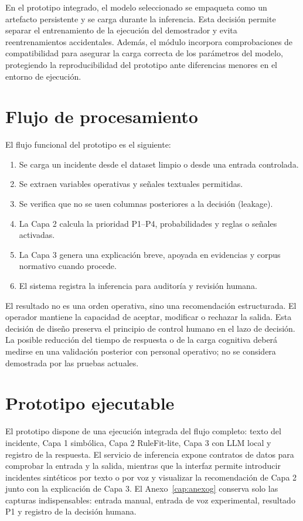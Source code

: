 En el prototipo integrado, el modelo seleccionado se empaqueta como un artefacto persistente y se carga durante la inferencia. Esta decisión permite separar el entrenamiento de la ejecución del demostrador y evita reentrenamientos accidentales. Además, el módulo incorpora comprobaciones de compatibilidad para asegurar la carga correcta de los parámetros del modelo, protegiendo la reproducibilidad del prototipo ante diferencias menores en el entorno de ejecución.

\section{Flujo de procesamiento}

El flujo funcional del prototipo es el siguiente:

\begin{enumerate}
    \item Se carga un incidente desde el dataset limpio o desde una entrada controlada.
    \item Se extraen variables operativas y señales textuales permitidas.
    \item Se verifica que no se usen columnas posteriores a la decisión (leakage).
    \item La Capa 2 calcula la prioridad P1--P4, probabilidades y reglas o señales activadas.
    \item La Capa 3 genera una explicación breve, apoyada en evidencias y corpus normativo cuando procede.
    \item El sistema registra la inferencia para auditoría y revisión humana.
\end{enumerate}

El resultado no es una orden operativa, sino una recomendación estructurada. El operador mantiene la capacidad de aceptar, modificar o rechazar la salida. Esta decisión de diseño preserva el principio de control humano en el lazo de decisión. La posible reducción del tiempo de respuesta o de la carga cognitiva deberá medirse en una validación posterior con personal operativo; no se considera demostrada por las pruebas actuales.

\section{Prototipo ejecutable}

El prototipo dispone de una ejecución integrada del flujo completo: texto del incidente, Capa 1 simbólica, Capa 2 RuleFit-lite, Capa 3 con LLM local y registro de la respuesta. El servicio de inferencia expone contratos de datos para comprobar la entrada y la salida, mientras que la interfaz permite introducir incidentes sintéticos por texto o por voz y visualizar la recomendación de Capa 2 junto con la explicación de Capa 3. El Anexo~\ref{cap:anexog} conserva solo las capturas indispensables: entrada manual, entrada de voz experimental, resultado P1 y registro de la decisión humana.

